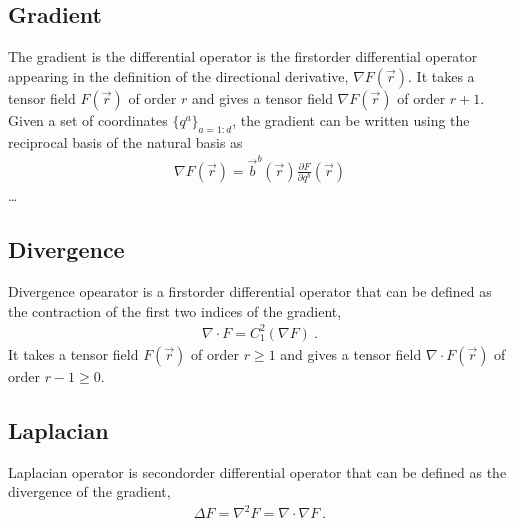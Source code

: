 \documentclass[letterpaper,10pt,english]{jupyterBook}
\begin{document}
\subsection{Gradient}
\label{\detokenize{ch/tensor-algebra-calculus/calculus-euclidean:gradient}}\label{\detokenize{ch/tensor-algebra-calculus/calculus-euclidean:tensor-calculus-differential-operators-gradient}}
\sphinxAtStartPar
The gradient is the differential operator is the first\sphinxhyphen{}order differential operator appearing in the definition of the directional derivative, \(\nabla F(\vec{r})\). It takes a tensor field \(F(\vec{r})\) of order \(r\) and gives a tensor field \(\nabla F(\vec{r})\) of order \(r+1\). Given a set of coordinates \(\{q^a\}_{a=1:d}\), the gradient can be written using the reciprocal basis of the natural basis as
\begin{equation*}
\begin{split}\nabla F(\vec{r}) = \vec{b}^b(\vec{r}) \frac{\partial F}{\partial q^b}(\vec{r})\end{split}
\end{equation*}
\sphinxAtStartPar
{} …


\subsection{Divergence}
\label{\detokenize{ch/tensor-algebra-calculus/calculus-euclidean:divergence}}\label{\detokenize{ch/tensor-algebra-calculus/calculus-euclidean:tensor-calculus-differential-operators-divergence}}
\sphinxAtStartPar
Divergence opearator is a first\sphinxhyphen{}order differential operator that can be defined as the contraction of the first two indices of the gradient,
\begin{equation*}
\begin{split}\nabla \cdot F = C_{1}^{2}\left( \nabla F \right) \ .\end{split}
\end{equation*}
\sphinxAtStartPar
It takes a tensor field \(F(\vec{r})\) of order \(r \ge 1\) and gives a tensor field \(\nabla \cdot F(\vec{r})\) of order \(r-1 \ge 0\).


\subsection{Laplacian}
\label{\detokenize{ch/tensor-algebra-calculus/calculus-euclidean:laplacian}}\label{\detokenize{ch/tensor-algebra-calculus/calculus-euclidean:tensor-calculus-differential-operators-laplacian}}
\sphinxAtStartPar
Laplacian operator is second\sphinxhyphen{}order differential operator that can be defined as the divergence of the gradient,
\begin{equation*}
\begin{split}\Delta F = \nabla^2 F = \nabla \cdot \nabla F \ .\end{split}
\end{equation*}
\end{document}
